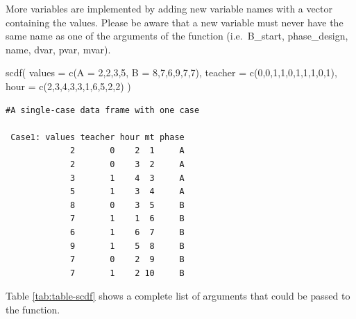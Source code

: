 \documentclass[
]{book}
\newenvironment{Shaded}{\begin{snugshade}}{\end{snugshade}}
\newcommand{\AttributeTok}[1]{\textcolor[rgb]{0.77,0.63,0.00}{#1}}
\newcommand{\DecValTok}[1]{\textcolor[rgb]{0.00,0.00,0.81}{#1}}
\newcommand{\FunctionTok}[1]{\textcolor[rgb]{0.00,0.00,0.00}{#1}}
\newcommand{\NormalTok}[1]{#1}
\begin{document}
More variables are implemented by adding new variable names with a vector containing the values. Please be aware that a new variable must never have the same name as one of the arguments of the function (i.e.~B\_start, phase\_design, name, dvar, pvar, mvar).

\begin{Shaded}
\begin{Highlighting}[]
\FunctionTok{scdf}\NormalTok{(}
  \AttributeTok{values =} \FunctionTok{c}\NormalTok{(}\AttributeTok{A =} \DecValTok{2}\NormalTok{,}\DecValTok{2}\NormalTok{,}\DecValTok{3}\NormalTok{,}\DecValTok{5}\NormalTok{, }\AttributeTok{B =} \DecValTok{8}\NormalTok{,}\DecValTok{7}\NormalTok{,}\DecValTok{6}\NormalTok{,}\DecValTok{9}\NormalTok{,}\DecValTok{7}\NormalTok{,}\DecValTok{7}\NormalTok{), }
  \AttributeTok{teacher =} \FunctionTok{c}\NormalTok{(}\DecValTok{0}\NormalTok{,}\DecValTok{0}\NormalTok{,}\DecValTok{1}\NormalTok{,}\DecValTok{1}\NormalTok{,}\DecValTok{0}\NormalTok{,}\DecValTok{1}\NormalTok{,}\DecValTok{1}\NormalTok{,}\DecValTok{1}\NormalTok{,}\DecValTok{0}\NormalTok{,}\DecValTok{1}\NormalTok{), }
  \AttributeTok{hour =} \FunctionTok{c}\NormalTok{(}\DecValTok{2}\NormalTok{,}\DecValTok{3}\NormalTok{,}\DecValTok{4}\NormalTok{,}\DecValTok{3}\NormalTok{,}\DecValTok{3}\NormalTok{,}\DecValTok{1}\NormalTok{,}\DecValTok{6}\NormalTok{,}\DecValTok{5}\NormalTok{,}\DecValTok{2}\NormalTok{,}\DecValTok{2}\NormalTok{)}
\NormalTok{)}
\end{Highlighting}
\end{Shaded}

\begin{verbatim}
#A single-case data frame with one case

 Case1: values teacher hour mt phase
             2       0    2  1     A
             2       0    3  2     A
             3       1    4  3     A
             5       1    3  4     A
             8       0    3  5     B
             7       1    1  6     B
             6       1    6  7     B
             9       1    5  8     B
             7       0    2  9     B
             7       1    2 10     B
\end{verbatim}

Table \ref{tab:table-scdf} shows a complete list of arguments that could be passed to the function.
\end{document}
